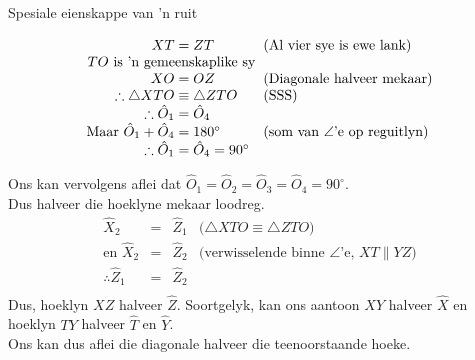 \begin{wex}{Spesiale eienskappe van 'n ruit}
{}
{
\begin{equation*}
 \begin{array}{r@{\;}l@{\quad}l}
XT &= ZT & \mbox{(Al vier sye is ewe lank)} \\
 \multicolumn{2}{c}{TO\mbox{ is 'n gemeenskaplike sy}} & \\ 
XO &= OZ & \mbox{(Diagonale halveer mekaar)} \\ 
\therefore \triangle XTO &\equiv \triangle ZTO & \mbox{(SSS)} \\
\therefore \hat{O}_1 &= \hat{O}_4 & \\
\mbox{Maar }\hat{O}_1 + \hat{O}_4 &= 180^\circ & \mbox{(som van $\angle$'e op reguitlyn)} \\
\therefore \hat{O}_1 &= \hat{O}_4 = 90^\circ & 
 \end{array}

\end{equation*}


Ons kan vervolgens aflei dat $\hat{O}_1 = \hat{O}_2 = \hat{O}_3 = \hat{O}_4 = 90^\circ$. \\
Dus halveer die hoeklyne mekaar loodreg.
\begin{equation*}
 \begin{array}{rcll}
 \hat{X}_2 &=& \hat{Z}_1 & \mbox{($\triangle XTO \equiv \triangle ZTO$)} \\
\mbox{en }\hat{X}_2 &=& \hat{Z}_2 & \mbox{(verwisselende binne $\angle$'e, $XT \parallel YZ$)} \\
\therefore \hat{Z}_1 &=& \hat{Z}_2 & \\
 \end{array}

\end{equation*}
Dus, hoeklyn $XZ$ halveer $\hat{Z}$. 
Soortgelyk, kan ons aantoon $XY$ halveer $\hat{X}$
en hoeklyn $TY$ halveer $\hat{T}$ en $\hat{Y}$. \\ 
Ons kan dus aflei die diagonale halveer die teenoorstaande hoeke.
}
\end{wex}

